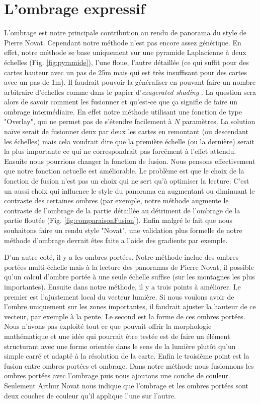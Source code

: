 \section{L'ombrage expressif}
	L'ombrage est notre principale contribution au rendu de panorama du style de Pierre Novat. Cependant notre méthode n'est pas encore assez générique. En effet, notre méthode se base uniquement sur une pyramide Laplacienne à deux échelles (Fig. \ref{fig:pyramide}), l'une floue, l'autre détaillée (ce qui suffit pour des cartes hauteur avec un pas de 25m mais qui est très insuffisant pour des cartes avec un pas de 1m). Il faudrait pouvoir la généraliser en pouvant faire un nombre arbitraire d’échelles comme dans le papier d'\textit{exagerated shading}  \cite{rusinkiewicz2006exaggerated}. La question sera alors de savoir comment les fusionner et qu'est-ce que ça signifie de faire un ombrage intermédiaire.  En effet notre méthode utilisant une fonction de type "Overlay", qui ne permet pas de s’étendre facilement à $N$ paramètres. La solution naïve serait de fusionner deux par deux les cartes en remontant (ou descendant les échelles) mais cela voudrait dire que la première échelle (ou la dernière) serait la plus importante ce qui ne correspondrait pas forcément à l'effet attendu. Ensuite nous pourrions changer la fonction de fusion. Nous pensons effectivement que notre fonction actuelle est améliorable. Le problème est que le choix de la fonction de fusion n'est pas un choix qui ne sert qu'à optimiser la lecture. C'est un aussi choix qui influence le style du panorama en augmentant ou diminuant le contraste des certaines ombres (par exemple, notre méthode augmente le contraste de l'ombrage de la partie détaillée au détriment de l'ombrage de la partie floutée (Fig. \ref{fig:comparaisonFusion}). Enfin malgré le fait que nous souhaitons faire un rendu style "Novat", une validation plus formelle de notre méthode d'ombrage devrait êtes faite a l'aide des gradients par exemple. 

D'un autre coté, il y a les ombres portées. Notre méthode inclue des ombres portées multi-échelle mais à la lecture des panoramas de Pierre Novat, il possible qu'un calcul d'ombre portée à une seule échelle suffise (sur les montagnes les plus importantes). Ensuite dans notre méthode, il y a trois points à améliorer. Le premier est l'ajustement local du vecteur lumière. Si nous voulons avoir de l'ombre uniquement sur les zones importantes, il faudrait ajuster la hauteur de ce vecteur, par exemple à la pente. Le second est la forme de ces ombres portées. Nous n'avons pas exploité tout ce que pouvait offrir la morphologie mathématique et une idée qui pourrait être testée est de faire un élément structurant avec une forme orientée dans le sens de la lumière plutôt qu'un simple carré et adapté à la résolution de la carte. Enfin le troisième point est la fusion entre ombres portées et ombrage. Dans notre méthode nous fusionnons les ombres portées avec l'ombrage puis nous ajoutons une couche de couleur. Seulement Arthur Novat nous indique que l'ombrage et les ombres portées sont deux couches de couleur qu'il applique l'une sur l'autre. 

